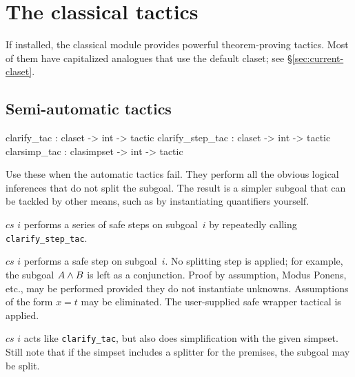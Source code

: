 \section{The classical tactics}
 If installed, the classical module provides
powerful theorem-proving tactics.  Most of them have capitalized analogues
that use the default claset; see \S\ref{sec:current-claset}.

\subsection{Semi-automatic tactics}
\begin{ttbox} 
clarify_tac      : claset -> int -> tactic
clarify_step_tac : claset -> int -> tactic
clarsimp_tac     : clasimpset -> int -> tactic
\end{ttbox}
Use these when the automatic tactics fail.  They perform all the obvious
logical inferences that do not split the subgoal.  The result is a
simpler subgoal that can be tackled by other means, such as by
instantiating quantifiers yourself.
\begin{ttdescription}
\item[\ttindexbold{clarify_tac} $cs$ $i$] performs a series of safe steps on
subgoal~$i$ by repeatedly calling \texttt{clarify_step_tac}.
\item[\ttindexbold{clarify_step_tac} $cs$ $i$] performs a safe step on
  subgoal~$i$.  No splitting step is applied; for example, the subgoal $A\wedge
  B$ is left as a conjunction.  Proof by assumption, Modus Ponens, etc., may be
  performed provided they do not instantiate unknowns.  Assumptions of the
  form $x=t$ may be eliminated.  The user-supplied safe wrapper tactical is
  applied.
\item[\ttindexbold{clarsimp_tac} $cs$ $i$] acts like \texttt{clarify_tac}, but
also does simplification with the given simpset. Still note that if the simpset 
includes a splitter for the premises, the subgoal may be split.
\end{ttdescription}


